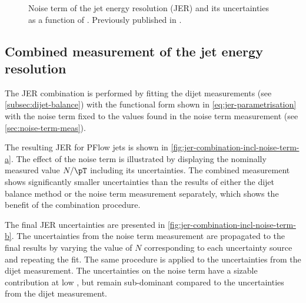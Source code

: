 % 
% 



\begin{figure}
    \caption[Noise term of the JER and its uncertainties.]{Noise term of the jet energy resolution (JER) and its uncertainties as a function of \abseta. Previously published in .}
    \label{fig:noise-term-results-pflow}
\end{figure}


\subsection{Combined measurement of the jet energy resolution}
\label{subsec:jer-combination}
The JER combination is performed by fitting the dijet \insitu measurements (see \cref{subsec:dijet-balance}) with the functional form shown in \cref{eq:jer-parametrisation} with the noise term fixed to the values found in the noise term measurement (see \cref{sec:noise-term-meas}).

The resulting JER for PFlow jets is shown in \cref{fig:jer-combination-incl-noise-term-a}. The effect of the noise term is illustrated by displaying the nominally measured value $N / \pT$ including its uncertainties.
The combined \insitu measurement shows significantly smaller uncertainties than the results of either the dijet balance method or the noise term measurement separately, which shows the benefit of the combination procedure.

The final JER uncertainties are presented in \cref{fig:jer-combination-incl-noise-term-b}.
The uncertainties from the noise term measurement are propagated to the final results by varying the value of $N$ corresponding to each uncertainty source and repeating the fit. %
The same procedure is applied to the uncertainties from the dijet \insitu measurement.
The uncertainties on the noise term have a sizable contribution at low \pT, but remain sub-dominant compared to the uncertainties from the dijet measurement.

